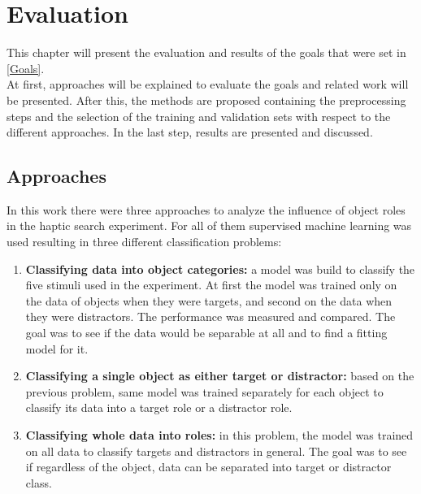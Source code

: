 
\chapter{Evaluation} %

\label{Evaluation} %
This chapter will present the evaluation and results of the goals that were set in \ref{Goals}.\\
At first, approaches will be explained to evaluate the goals and related work will be presented. After this, the methods are proposed containing the preprocessing steps and the selection of the training and validation sets with respect to the different approaches. In the last step, results are presented and discussed.


\section{Approaches} \label{approaches}
In this work there were three approaches to analyze the influence of object roles in the haptic search experiment. For all of them supervised machine learning was used resulting in three different classification problems: \\
\begin{enumerate}
	\item \textbf{Classifying data into object categories:} a model was build to classify the five stimuli used in the experiment. At first the model was trained only on the data of objects when they were targets, and second on the data when they were distractors. The performance was measured and compared. The goal was to see if the data would be separable at all and to find a fitting model for it.
	
	\item \textbf{Classifying a single object as either target or distractor:} based on the previous problem, same model was trained separately for each object to classify its data into a target role or a distractor role. 
	
	\item \textbf{Classifying whole data into roles:} in this problem, the model was trained on all data to classify targets and distractors in general. The goal was to see if regardless of the object, data can be separated into target or distractor class.       
\end{enumerate}

